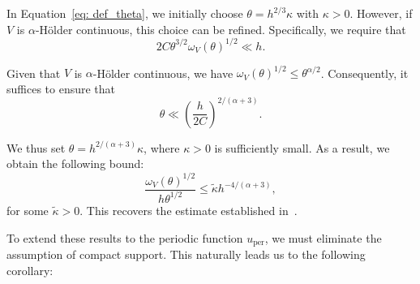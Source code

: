 \documentclass[leqno,11pt,letterpaper, english]{amsart}
\theoremstyle{plain}
\theoremstyle{definition}
\numberwithin{equation}{section}
\begin{document}
In Equation~\eqref{eq: def_theta}, we initially choose $\theta = h^{2/3}\kappa$ with $\kappa > 0$. However, if $V$ is $\alpha$-H\"older continuous, this choice can be refined. Specifically, we require that
$$2C \theta^{3/2} \omega_V(\theta)^{1/2} \ll h.$$

Given that $V$ is $\alpha$-H\"older continuous, we have $\omega_V(\theta)^{1/2} \leq \theta^{\alpha/2}$. Consequently, it suffices to ensure that
$$\theta \ll \left(\frac{h}{2C}\right)^{2/(\alpha+3)}.$$

We thus set $\theta = h^{2/(\alpha+3)}\kappa$, where $\kappa > 0$ is sufficiently small. As a result, we obtain the following bound:
$$\frac{\omega_V(\theta)^{1/2}}{h\theta^{1/2}} \leq \tilde{\kappa} h^{-4/(\alpha+3)},$$
for some $\tilde{\kappa} > 0$. This recovers the estimate established in~\cite{vodevSemiclassicalResolventEstimates2020}.

To extend these results to the periodic function $u_{\text{per}}$, we must eliminate the assumption of compact support. This naturally leads us to the following corollary:
\end{document}
